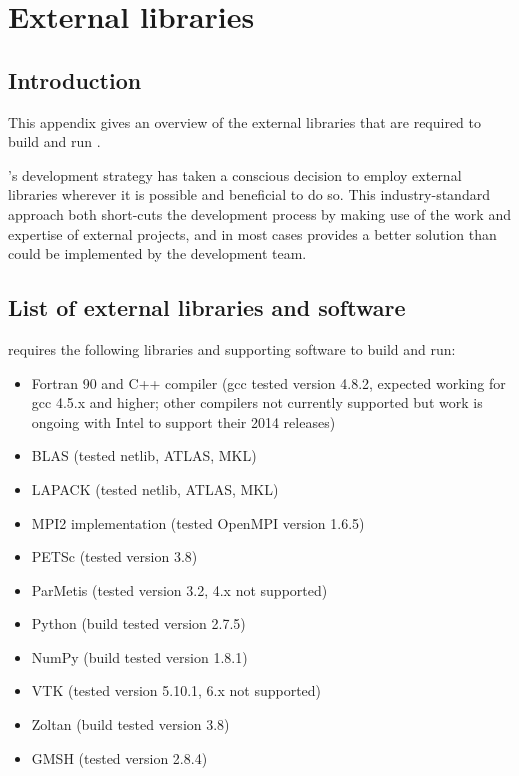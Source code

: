 \chapter{External libraries}\label{chap:external}

\section{Introduction}

This appendix gives an overview of the external libraries that are required to
build and run \fluidity.

\fluidity's development strategy has taken a conscious decision to employ
external libraries wherever it is possible and beneficial to do so. This
industry-standard approach both short-cuts the development process by making
use of the work and expertise of external projects, and in most cases provides
a better solution than could be implemented by the \fluidity development team.

\section{List of external libraries and software}
\label{sec:required_libraries_list}

\fluidity requires the following libraries and supporting software to build and
run:

\begin{itemize}
\item Fortran 90 and C++ compiler (gcc tested version 4.8.2, expected working for gcc 4.5.x and higher; other compilers not currently supported but work is ongoing with Intel to support their 2014 releases)
\item BLAS (tested netlib, ATLAS, MKL)
\item LAPACK (tested netlib, ATLAS, MKL)
\item MPI2 implementation (tested OpenMPI version 1.6.5)
\item PETSc (tested version 3.8)
\item ParMetis (tested version 3.2, 4.x not supported)
\item Python (build tested version 2.7.5)
\item NumPy (build tested version 1.8.1)
\item VTK (tested version 5.10.1, 6.x not supported)
\item Zoltan (build tested version 3.8)
\item GMSH (tested version 2.8.4)
\end{itemize}

